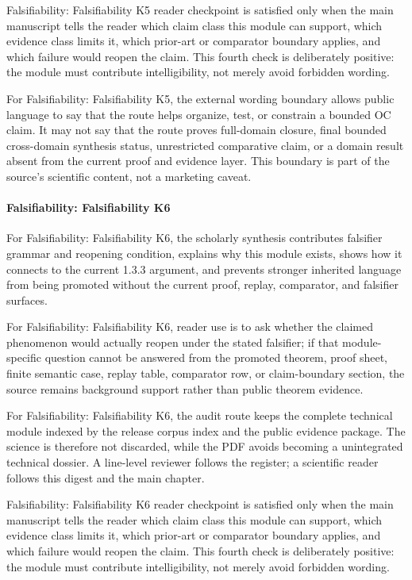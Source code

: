 Falsifiability: Falsifiability K5 reader checkpoint is satisfied only when the main manuscript tells the reader which claim class this module can support, which evidence class limits it, which prior-art or comparator boundary applies, and which failure would reopen the claim. This fourth check is deliberately positive: the module must contribute intelligibility, not merely avoid forbidden wording.


For Falsifiability: Falsifiability K5, the external wording boundary allows public language to say that the route helps organize, test, or constrain a bounded OC claim. It may not say that the route proves full-domain closure, final bounded cross-domain synthesis status, unrestricted comparative claim, or a domain result absent from the current proof and evidence layer. This boundary is part of the source's scientific content, not a marketing caveat.


\paragraph{Falsifiability: Falsifiability K6}

For Falsifiability: Falsifiability K6, the scholarly synthesis contributes falsifier grammar and reopening condition, explains why this module exists, shows how it connects to the current 1.3.3 argument, and prevents stronger inherited language from being promoted without the current proof, replay, comparator, and falsifier surfaces.


For Falsifiability: Falsifiability K6, reader use is to ask whether the claimed phenomenon would actually reopen under the stated falsifier; if that module-specific question cannot be answered from the promoted theorem, proof sheet, finite semantic case, replay table, comparator row, or claim-boundary section, the source remains background support rather than public theorem evidence.


For Falsifiability: Falsifiability K6, the audit route keeps the complete technical module indexed by the release corpus index and the public evidence package. The science is therefore not discarded, while the PDF avoids becoming a unintegrated technical dossier. A line-level reviewer follows the register; a scientific reader follows this digest and the main chapter.


Falsifiability: Falsifiability K6 reader checkpoint is satisfied only when the main manuscript tells the reader which claim class this module can support, which evidence class limits it, which prior-art or comparator boundary applies, and which failure would reopen the claim. This fourth check is deliberately positive: the module must contribute intelligibility, not merely avoid forbidden wording.


